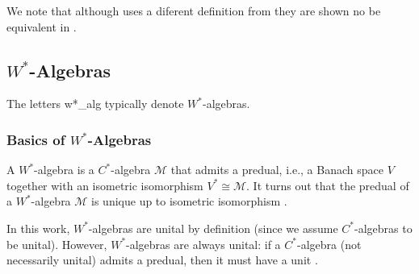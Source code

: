 We note that although \cite{sakaiCAlgebrasWAlgebras1998} uses a diferent definition from they are shown no be equivalent in \cite[Theorem 4.9]{takesakiTheoryOperatorAlgebras1979}.

\subsection{\( W^* \)-Algebras}


The letters \gls{w*_alg} typically denote $W^*$-algebras.

\subsubsection{Basics of \( W^* \)-Algebras}

\begin{definition}
A \( W^* \)-algebra is a \( C^* \)-algebra \( \mathscr{M} \) that admits a predual, i.e., a Banach space \( V \) together with an isometric isomorphism \( V^* \cong  \mathscr{M} \). It turns out that the predual of a \( W^* \)-algebra \(  \mathscr{M} \) is unique up to isometric isomorphism \cite[Corollary 1.13.3]{sakaiCAlgebrasWAlgebras1998}. 
\end{definition}

\begin{remark}
 In this work, \( W^* \)-algebras are unital by definition (since we assume \( C^* \)-algebras to be unital).  However, \( W^* \)-algebras are always unital: if a \( C^* \)-algebra (not necessarily unital) admits a predual, then it must have a unit \cite[Chapter 1.7]{sakaiCAlgebrasWAlgebras1998}.
\end{remark}


